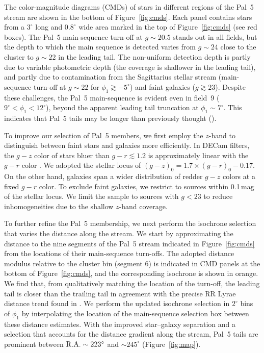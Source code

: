 \documentclass[twocolumn]{aastex62}
\begin{document}
The color-magnitude diagrams (CMDs) of stars in different regions of the Pal~5 stream are shown in the bottom of Figure~\ref{fig:cmds}.
Each panel contains stars from a $3^\circ$ long and $0.8^\circ$ wide area marked in the top of Figure~\ref{fig:cmds} (see red boxes).
The Pal~5 main-sequence turn-off at $g\sim20.5$ stands out in all fields, but the depth to which the main sequence is detected varies from $g\sim24$ close to the cluster to $g\sim22$ in the leading tail.
The non-uniform detection depth is partly due to variable photometric depth (the coverage is shallower in the leading tail), and partly due to contamination from the Sagittarius stellar stream (main-sequence turn-off at $g\sim22$ for $\phi_1\gtrsim-5^\circ$) and faint galaxies ($g\gtrsim23$).
Despite these challenges, the Pal~5 main-sequence is evident even in field~9 ($9^\circ<\phi_1<12^\circ$), beyond the apparent leading tail truncation at $\phi_1\sim7^\circ$.
This indicates that Pal~5 tails may be longer than previously thought (\citealt{Bernard:2016}).

To improve our selection of Pal~5 members, we first employ the $z$-band to distinguish between faint stars and galaxies more efficiently.
In DECam filters, the $g-z$ color of stars bluer than $g-r\lesssim1.2$ is approximately linear with the $g-r$ color \citep[e.g.,][]{dey2019}.
We adopted the stellar locus of $(g-z)_0 = 1.7\times(g-r)_0 -0.17$.
On the other hand, galaxies span a wider distribution of redder $g-z$ colors at a fixed $g-r$ color.
To exclude faint galaxies, we restrict to sources within 0.1\,mag of the stellar locus.
We limit the sample to sources with $g<23$ to reduce inhomogeneities due to the shallow $z$-band coverage.

To further refine the Pal~5 membership, we next perform the isochrone selection that varies the distance along the stream.
We start by approximating the distance to the nine segments of the Pal~5 stream indicated in Figure~\ref{fig:cmds} from the locations of their main-sequence turn-offs.
The adopted distance modulus relative to the cluster bin (segment 6) is indicated in CMD panels at the bottom of Figure~\ref{fig:cmds}, and the corresponding isochrone is shown in orange.
We find that, from qualitatively matching the location of the turn-off, the leading tail is closer than the trailing tail in agreement with the precise RR Lyrae distance trend found in \citet{Price-Whelan:2019}.
We perform the updated isochrone selection in $2^\circ$ bins of $\phi_1$ by interpolating the location of the main-sequence selection box between these distance estimates.
With the improved star--galaxy separation and a selection that accounts for the distance gradient along the stream, Pal~5 tails are prominent between $\rm R.A.\sim223^\circ$ and $\sim245^\circ$ (Figure~\ref{fig:map}).
\end{document}
